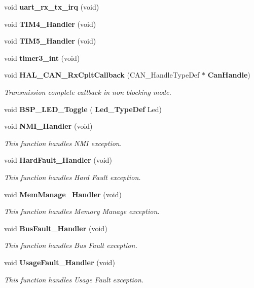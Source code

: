 \begin{DoxyCompactItemize}
\item 
void \textbf{ uart\+\_\+rx\+\_\+tx\+\_\+irq} (void)
\item 
void \textbf{ T\+I\+M4\+\_\+\+Handler} (void)
\item 
void \textbf{ T\+I\+M5\+\_\+\+Handler} (void)
\item 
void \textbf{ timer3\+\_\+int} (void)
\item 
void \textbf{ H\+A\+L\+\_\+\+C\+A\+N\+\_\+\+Rx\+Cplt\+Callback} (C\+A\+N\+\_\+\+Handle\+Type\+Def $\ast$\textbf{ Can\+Handle})
\begin{DoxyCompactList}\small\item\em Transmission complete callback in non blocking mode. \end{DoxyCompactList}\item 
void \textbf{ B\+S\+P\+\_\+\+L\+E\+D\+\_\+\+Toggle} (\textbf{ Led\+\_\+\+Type\+Def} Led)
\item 
void \textbf{ N\+M\+I\+\_\+\+Handler} (void)
\begin{DoxyCompactList}\small\item\em This function handles N\+MI exception. \end{DoxyCompactList}\item 
void \textbf{ Hard\+Fault\+\_\+\+Handler} (void)
\begin{DoxyCompactList}\small\item\em This function handles Hard Fault exception. \end{DoxyCompactList}\item 
void \textbf{ Mem\+Manage\+\_\+\+Handler} (void)
\begin{DoxyCompactList}\small\item\em This function handles Memory Manage exception. \end{DoxyCompactList}\item 
void \textbf{ Bus\+Fault\+\_\+\+Handler} (void)
\begin{DoxyCompactList}\small\item\em This function handles Bus Fault exception. \end{DoxyCompactList}\item 
void \textbf{ Usage\+Fault\+\_\+\+Handler} (void)
\begin{DoxyCompactList}\small\item\em This function handles Usage Fault exception. \end{DoxyCompactList}\item 

\end{DoxyCompactItemize}
